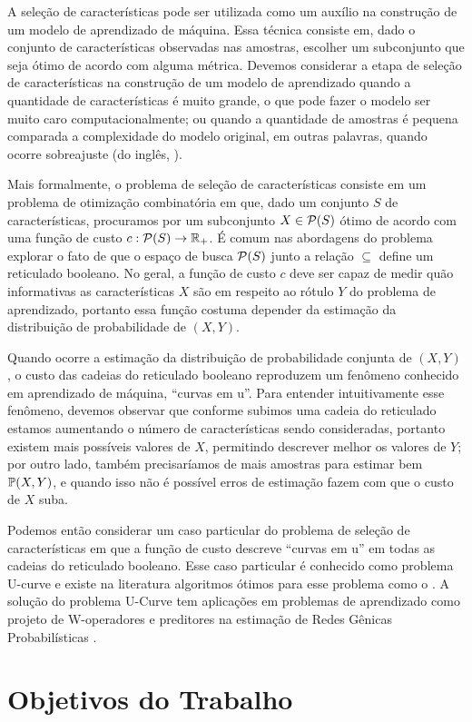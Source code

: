 
A seleção de características pode ser utilizada como um auxílio na
construção de um modelo de aprendizado de máquina. Essa técnica consiste
em, dado o conjunto de características observadas nas amostras, escolher
um subconjunto que seja ótimo de acordo com alguma métrica. Devemos 
considerar a etapa de seleção de características na construção de um 
modelo de aprendizado quando a quantidade de características é muito
grande, o que pode fazer o modelo ser muito caro computacionalmente; ou
quando a quantidade de amostras é pequena comparada a complexidade do 
modelo original, em outras palavras, quando ocorre sobreajuste (do 
inglês, ).

Mais formalmente, o problema de seleção de características consiste em
um problema de otimização combinatória em que, dado um conjunto $S$ de 
características, procuramos por um subconjunto $X \in \mathcal{P} (S)$
ótimo de acordo com uma função de custo $c : \mathcal{P}(S) \to 
\mathbb{R}_{+}$. É comum nas abordagens do problema explorar o fato de que
o espaço de busca $\mathcal{P}(S)$ junto a relação $\subseteq$ define um
reticulado booleano. No geral, a função de custo $c$ deve ser capaz de
medir quão informativas as características $X$ são em respeito ao rótulo
$Y$ do problema de aprendizado, portanto essa função costuma depender da
estimação da distribuição de probabilidade de $(X, Y)$.

Quando ocorre a estimação da distribuição de probabilidade conjunta de 
$(X, Y)$, o custo das cadeias do reticulado booleano reproduzem um
fenômeno conhecido em aprendizado de máquina, ``curvas em u''. Para 
entender intuitivamente esse fenômeno, devemos observar que conforme 
subimos uma cadeia do reticulado estamos aumentando o número de 
características sendo consideradas, portanto existem mais possíveis
valores de $X$, permitindo descrever melhor os valores de $Y$; por outro
lado, também precisaríamos de mais amostras para estimar bem 
$\mathbb{P} (X, Y)$, e quando isso não é possível erros de estimação
fazem com que o custo de $X$ suba.

Podemos então considerar um caso particular do problema de seleção de
características em que a função de custo descreve ``curvas em u''
em todas as cadeias do reticulado booleano. Esse caso particular é 
conhecido como problema U-curve e existe na literatura algoritmos ótimos
para esse problema como o . A solução do problema
U-Curve tem aplicações em problemas de aprendizado como projeto de 
W-operadores \cite{MJCJJB} e preditores na estimação de Redes Gênicas 
Probabilísticas \cite{BCJMJ07}.


\section{Objetivos do Trabalho}

